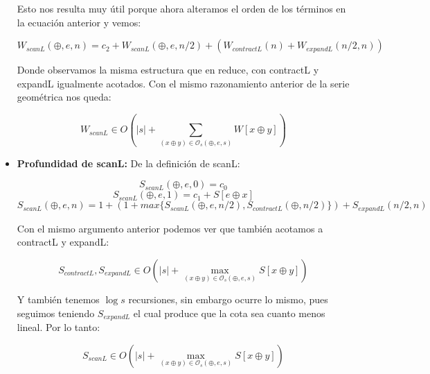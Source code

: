\documentclass[12pt]{article}
\begin{document}
\begin{itemize}
    Esto nos resulta muy útil porque ahora alteramos el orden de los términos en la ecuación anterior y vemos:
    
    $$ W_{scanL}(\oplus, e, n) = c_2 + W_{scanL}(\oplus, e, n/2) + ( W_{contractL}(n) + W_{expandL}(n/2, n) ) $$
    
    Donde observamos la misma estructura que en reduce, con contractL y expandL igualmente acotados. Con el mismo razonamiento anterior de la serie geométrica nos queda:
    
    $$ W_{scanL} \in O(|s| + \sum\limits_{(x\oplus y)\in\mathcal{O}_s(\oplus,e,s)} W[x\oplus y]) $$
    

\item \textbf{Profundidad de scanL:}
    De la definición de scanL:
    
    $$ S_{scanL}(\oplus, e, 0) = c_0 $$
    $$ S_{scanL}(\oplus, e, 1) = c_1 + S[e \oplus x]  $$
    $$ S_{scanL}(\oplus, e, n) = 1 + ( 1 + max\{ S_{scanL}(\oplus, e, n/2), S_{contractL}(\oplus, n/2) \} ) + S_{expandL}(n/2, n) $$
    
    Con el mismo argumento anterior podemos ver que también acotamos a contractL y expandL:
    
    $$ S_{contractL}, S_{expandL} \in O(|s| + \max\limits_{(x\oplus y)\in\mathcal{O}_s(\oplus,e,s)} S[x\oplus y]) $$
    
    Y también tenemos $\log s$ recursiones, sin embargo ocurre lo mismo, pues seguimos teniendo $S_{expandL}$ el cual produce que la cota sea cuanto menos lineal. Por lo tanto:
    
    $$ S_{scanL} \in O(|s| + \max\limits_{(x\oplus y)\in\mathcal{O}_s(\oplus,e,s)} S[x\oplus y]) $$
    
\end{itemize}
\end{document}
